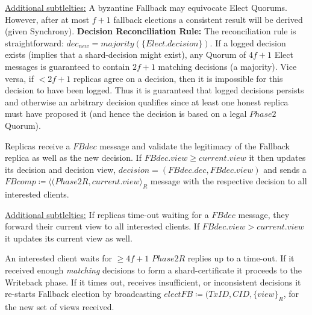 \underline{Additional subtlelties:} A byzantine Fallback may equivocate Elect Quorums. However, after at most $f+1$ fallback elections a consistent result will be derived (given Synchrony).
\textbf{Decision Reconciliation Rule:} The reconciliation rule is straightforward: $dec_{new} = majority(\{Elect.decision\})$. If a logged decision exists (implies that a shard-decision might exist), any Quorum of $4f+1$ Elect messages is guaranteed to contain $2f+1$ matching decisions (a majority). Vice versa, if $<2f+1$ replicas agree on a decision, then it is impossible for this decision to have been logged. Thus it is guaranteed that logged decisions persists and otherwise an arbitrary decision qualifies since at least one honest replica must have proposed it (and hence the decision is based on a legal $Phase2$ Quorum).



Replicas receive a $FBdec$ message and validate the legitimacy of the Fallback replica as well as the new decision. If $FBdec.view \geq current.view$ it then updates its decision and decision view, $decision = (FBdec.dec, FBdec.view)$ and sends a $FBcomp \coloneqq \langle(Phase2R, current.view\rangle_R$ message with the respective decision to all interested clients.

\underline{Additional subtlelties:} If replicas time-out waiting for a $FBdec$ message, they forward their current view to all interested clients. If $FBdec.view > current.view$ it updates its current view as well.

An interested client waits for $\geq 4f+1$ $Phase2R$ replies up to a time-out. If it received enough \textit{matching} decisions to form a shard-certificate it proceeds to the Writeback phase. If it times out, receives insufficient, or inconsistent decisions it re-starts Fallback election by broadcasting $electFB \coloneqq (TxID, CID, \{view\}_R$, for the new set of views received.

